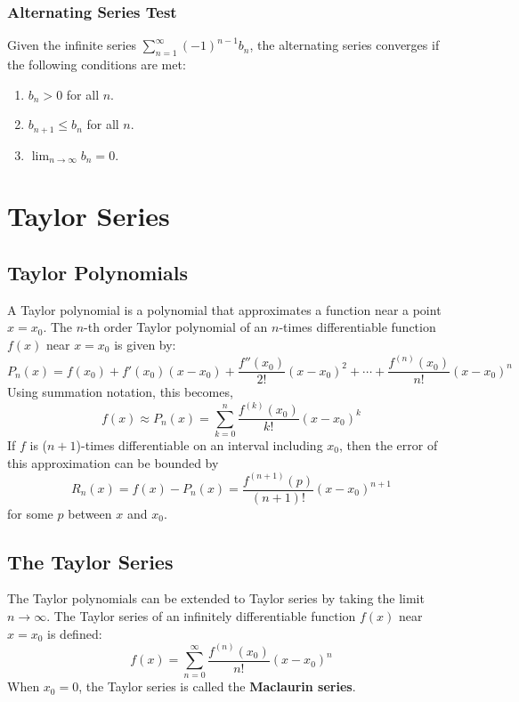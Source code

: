 \documentclass{article}
\begin{document}
\subsubsection{Alternating Series Test}
Given the infinite series \(\sum_{n=1}^{\infty} {\left( -1
\right)}^{n-1} b_n\), the alternating series converges if the following
conditions are met:
\begin{enumerate}[label=(\arabic*)]
    \item \(b_n > 0\) for all \(n\).
    \item \(b_{n+1} \leq b_n\) for all \(n\).
    \item \(\lim_{n \to \infty} b_n = 0\).
\end{enumerate}
\section{Taylor Series}
\subsection{Taylor Polynomials}
A Taylor polynomial is a polynomial that approximates a function near a
point \(x = x_0\). The \(n\)-th order Taylor polynomial of an
\(n\)-times differentiable function \(f\left( x \right)\) near \(x =
x_0\) is given by:
\begin{equation*}
    P_n\left( x \right) = f\left( x_0 \right) + f'\left( x_0 \right) \left( x - x_0 \right) + \frac{f''\left( x_0 \right)}{2!} {\left( x - x_0 \right)}^2 + \cdots + \frac{f^{\left( n \right)}\left( x_0 \right)}{n!} {\left( x - x_0 \right)}^n
\end{equation*}
Using summation notation, this becomes,
\begin{equation*}
    f\left( x \right) \approx P_n\left( x \right) = \sum_{k=0}^{n} \frac{f^{\left( k \right)}\left( x_0 \right)}{k!} {\left( x - x_0 \right)}^k
\end{equation*}
If \(f\) is (\(n+1\))-times differentiable on an interval including
\(x_0\), then the error of this approximation can be bounded by
\begin{equation*}
    R_n\left( x \right) = f\left( x \right) - P_n\left( x \right) = \frac{f^{\left( n+1 \right)}\left( p \right)}{\left( n+1 \right)!} {\left( x - x_0 \right)}^{n+1}
\end{equation*}
for some \(p\) between \(x\) and \(x_0\).
\subsection{The Taylor Series}
The Taylor polynomials can be extended to Taylor series by taking the
limit \(n \to \infty\). The Taylor series of an infinitely
differentiable function \(f\left( x \right)\) near \(x = x_0\) is
defined:
\begin{equation*}
    f\left( x \right) = \sum_{n=0}^{\infty} \frac{f^{\left( n \right)}\left( x_0 \right)}{n!} {\left( x - x_0 \right)}^n
\end{equation*}
When \(x_0 = 0\), the Taylor series is called the \textbf{Maclaurin series}.
\end{document}
